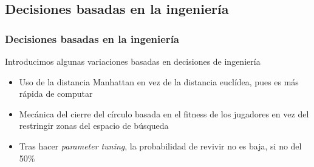 \documentclass{beamer}
\begin{document}
\subsection{Decisiones basadas en la ingeniería}

\begin{frame}
    \frametitle{Decisiones basadas en la ingeniería}

    Introducimos algunas variaciones basadas en decisiones de ingeniería

    \begin{itemize}
        \item Uso de la distancia Manhattan en vez de la distancia euclídea, pues es más rápida de computar
        \item Mecánica del cierre del círculo basada en el fitness de los jugadores en vez del restringir zonas del espacio de búsqueda
        \item Tras hacer \emph{parameter tuning}, la probabilidad de revivir no es baja, si no del 50\%
    \end{itemize}
\end{frame}
\end{document}

